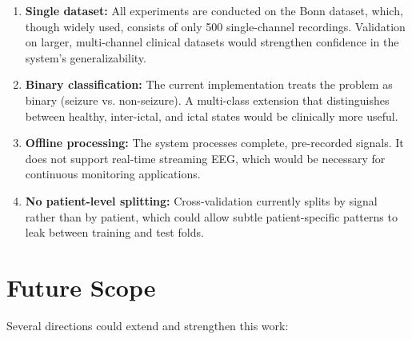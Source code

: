 \begin{enumerate}
    \item \textbf{Single dataset:} All experiments are conducted on the Bonn dataset, which, though widely used, consists of only 500 single-channel recordings. Validation on larger, multi-channel clinical datasets would strengthen confidence in the system's generalizability.
    
    \item \textbf{Binary classification:} The current implementation treats the problem as binary (seizure vs. non-seizure). A multi-class extension that distinguishes between healthy, inter-ictal, and ictal states would be clinically more useful.
    
    \item \textbf{Offline processing:} The system processes complete, pre-recorded signals. It does not support real-time streaming EEG, which would be necessary for continuous monitoring applications.
    
    \item \textbf{No patient-level splitting:} Cross-validation currently splits by signal rather than by patient, which could allow subtle patient-specific patterns to leak between training and test folds.
\end{enumerate}

\section{Future Scope}

Several directions could extend and strengthen this work:

